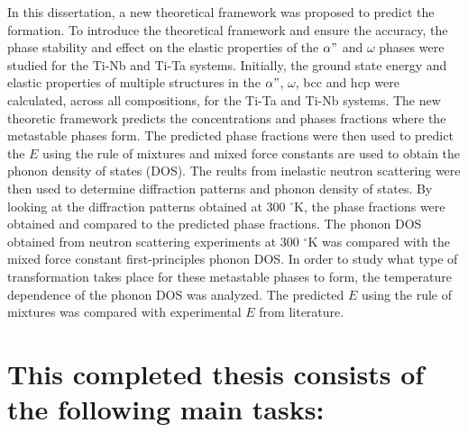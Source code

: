 In this dissertation, a new theoretical framework was proposed to predict the formation. To introduce the theoretical framework and ensure the accuracy, the phase stability and effect on the elastic properties of the $\alpha"$ and $\omega$ phases were studied for the Ti-Nb and Ti-Ta systems. Initially, the ground state energy and elastic properties of multiple structures in the $\alpha"$, $\omega$, bcc and hcp were calculated, across all compositions, for the Ti-Ta and Ti-Nb systems. The new theoretic framework predicts the concentrations and phases fractions where the metastable phases form. The predicted phase fractions were then used to predict the $E$ using the rule of mixtures and mixed force constants are used to obtain the phonon density of states (DOS). The reults from inelastic neutron scattering were then used to determine diffraction patterns and phonon density of states. By looking at the diffraction patterns obtained at 300 $^\circ$K, the phase fractions were obtained and compared to the predicted phase fractions. The phonon DOS obtained from neutron scattering experiments at 300 $^\circ$K was compared with the mixed force constant first-principles phonon DOS. In order to study what type of transformation takes place for these metastable phases to form, the temperature dependence of the phonon DOS was analyzed. The predicted $E$ using the rule of mixtures was compared with experimental $E$ from literature.


\pagebreak
\section*{This completed thesis consists of the following main tasks:}

